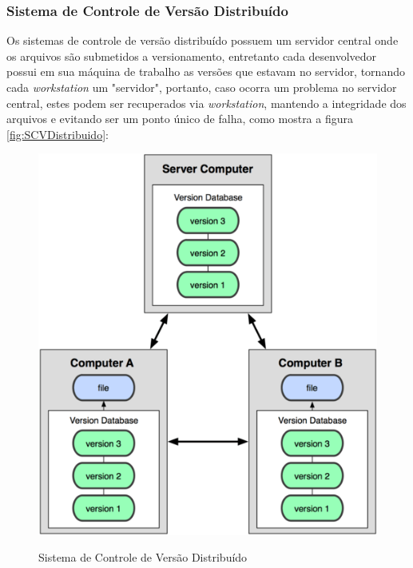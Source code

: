 \subsubsection{Sistema de Controle de Versão Distribuído}Os sistemas de controle de versão distribuído possuem um servidor central onde os arquivos são submetidos a versionamento, entretanto cada desenvolvedor possui em sua máquina de trabalho as versões que estavam no servidor, tornando cada \textit{workstation} um "servidor", portanto, caso ocorra um problema no servidor central, estes podem ser recuperados via \textit{workstation}, mantendo a integridade dos arquivos e evitando ser um ponto único de falha, como mostra a figura \autoref{fig:SCVDistribuido}:
\begin{figure}[tbh]
\centering
\caption[Sistema de Controle de Versão Distribuído]{Sistema de Controle de Versão Distribuído}
\includegraphics[width=0.7\linewidth]{./images/scvdist}
\label{fig:SCVDistribuido}
\end{figure}
